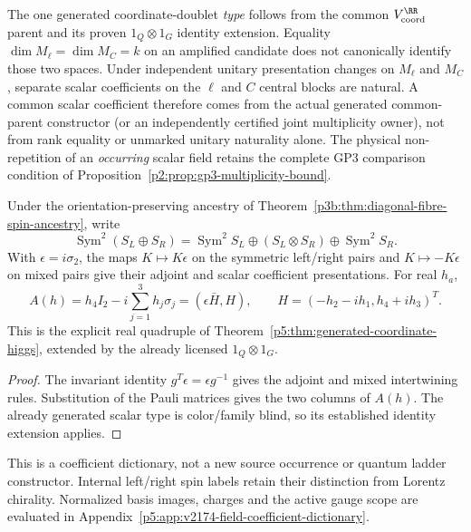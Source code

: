 \documentclass[12pt,a4paper]{article}
\begin{document}
\begin{remark}
\label{p5:rem:v329-commonparent-higgs}
The one generated coordinate-doublet \emph{type} follows from the
common $V_{\rm coord}^{\RR}$ parent and its proven $1_Q\otimes1_G$
identity extension. Equality $\dim M_\ell=\dim M_C=k$ on an
amplified candidate does not canonically identify those two spaces.
Under independent unitary presentation changes on $M_\ell$ and $M_C$,
separate scalar coefficients on the $\ell$ and $C$ central blocks
are natural. A common scalar coefficient therefore comes from the
actual generated common-parent constructor (or an independently
certified joint multiplicity owner), not from rank equality or
unmarked unitary naturality alone. The physical non-repetition of
an \emph{occurring} scalar field retains the complete GP3 comparison
condition of Proposition~\ref{p2:prop:gp3-multiplicity-bound}.
\end{remark}


\begin{corollary}
\label{p5:cor:v2174-pair-field-dictionary}
Under the orientation-preserving ancestry of
Theorem~\ref{p3b:thm:diagonal-fibre-spin-ancestry}, write
\[
 \operatorname{Sym}^2(S_L\oplus S_R)
  =\operatorname{Sym}^2S_L\oplus(S_L\otimes S_R)
                   \oplus\operatorname{Sym}^2S_R.
\]
With $\epsilon=i\sigma_2$, the maps $K\mapsto K\epsilon$ on the
symmetric left/right pairs and $K\mapsto-K\epsilon$ on mixed pairs
give their adjoint and scalar coefficient presentations. For real $h_a$,
\begin{equation}
 A(h)=h_4I_2-i\sum_{j=1}^3h_j\sigma_j
       =(\epsilon\bar H,H),\qquad
 H=(-h_2-ih_1,h_4+ih_3)^T.
 \label{p5:eq:v2174-pair-field-dictionary}
\end{equation}
This is the explicit real quadruple of
Theorem~\ref{p5:thm:generated-coordinate-higgs}, extended by the already
licensed $1_Q\otimes1_G$.
\end{corollary}
\begin{proof}
The invariant identity $g^T\epsilon=\epsilon g^{-1}$ gives the adjoint
and mixed intertwining rules. Substitution of the Pauli matrices gives the
two columns of $A(h)$. The already generated scalar type is color/family
blind, so its established identity extension applies.
\end{proof}
This is a coefficient dictionary, not a new source occurrence or quantum
ladder constructor. Internal left/right spin labels retain their distinction
from Lorentz chirality. Normalized basis images, charges and the active gauge
scope are evaluated in Appendix~\ref{p5:app:v2174-field-coefficient-dictionary}.
\end{document}

